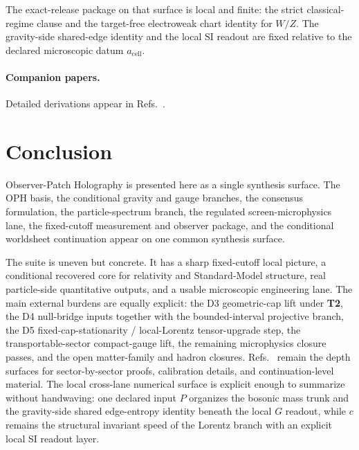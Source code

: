 The exact-release package on that surface is local and finite: the strict classical-regime clause
and the target-free electroweak chart identity for \(W/Z\).
The gravity-side shared-edge identity and the local SI readout are fixed relative to the declared
microscopic datum \(a_{\mathrm{cell}}\).

\paragraph{Companion papers.}
Detailed derivations appear in Refs.~\cite{ophcompact,ophconsensus,ophmicrophysics,ophparticles}.

\section{Conclusion}

Observer-Patch Holography is presented here as a single synthesis surface. The OPH basis, the
conditional gravity and gauge branches, the consensus formulation, the particle-spectrum branch,
the regulated screen-microphysics lane, the fixed-cutoff measurement and observer package, and the
conditional worldsheet continuation appear on one common synthesis surface.

The suite is uneven but concrete. It has a sharp
fixed-cutoff local picture, a conditional recovered core for relativity and Standard-Model
structure, real particle-side quantitative outputs, and a usable microscopic engineering lane. The
main external burdens are equally explicit: the D3 geometric-cap lift under \textbf{T2}, the D4
null-bridge inputs together with the bounded-interval projective branch, the D5
fixed-cap-stationarity / local-Lorentz tensor-upgrade step, the transportable-sector compact-gauge
lift, the remaining microphysics closure passes, and the open matter-family and hadron closures.
Refs.~\cite{ophcompact,ophconsensus,ophmicrophysics,ophparticles} remain the depth surfaces for
sector-by-sector proofs, calibration details, and continuation-level material. The local
cross-lane numerical surface is explicit enough to summarize without handwaving: one
declared input \(P\) organizes the bosonic mass trunk and the gravity-side shared edge-entropy
identity beneath the local \(G\) readout,
while \(c\) remains the structural invariant speed of the Lorentz branch with an explicit local
SI readout layer.
